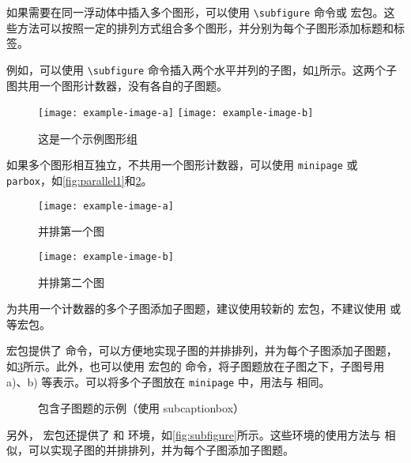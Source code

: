 如果需要在同一浮动体中插入多个图形，可以使用 \verb|\subfigure| 命令或  宏包。这些方法可以按照一定的排列方式组合多个图形，并分别为每个子图形添加标题和标签。

例如，可以使用 \verb|\subfigure| 命令插入两个水平并列的子图，如\cref{fig:example-subfig-1}所示。这两个子图共用一个图形计数器，没有各自的子图题。

\begin{figure}[!htp]
\centering
\texttt{[image: example-image-a]}
\hspace{1cm}
\texttt{[image: example-image-b]}
\caption{这是一个示例图形组}
\label{fig:example-subfig-1}
\end{figure}

如果多个图形相互独立，不共用一个图形计数器，可以使用 \texttt{minipage} 或 \texttt{parbox}，如\cref{fig:parallel1}和\cref{fig:parallel2}。

\begin{figure}[!htp]
\begin{minipage}{0.4\textwidth}
\centering
\texttt{[image: example-image-a]}
\caption{并排第一个图}
\label{fig:parallel1}
\end{minipage}\hfill
\begin{minipage}{0.4\textwidth}
\centering
\texttt{[image: example-image-b]}
\caption{并排第二个图}
\label{fig:parallel2}
\end{minipage}
\end{figure}

为共用一个计数器的多个子图添加子图题，建议使用较新的  宏包，不建议使用  或  等宏包。

 宏包提供了  命令，可以方便地实现子图的并排排列，并为每个子图添加子图题，如\cref{fig:subcaptionbox}所示。此外，也可以使用  宏包的  命令，将子图题放在子图之下，子图号用 a)、b) 等表示。可以将多个子图放在 \texttt{minipage} 中，用法与  相同。

\begin{figure}[!htp]
\centering
{}
\hspace{1cm}
\caption{包含子图题的示例（使用 subcaptionbox）}
\label{fig:subcaptionbox}
\end{figure}

另外， 宏包还提供了  和  环境，如\cref{fig:subfigure}所示。这些环境的使用方法与  相似，可以实现子图的并排排列，并为每个子图添加子图题。

